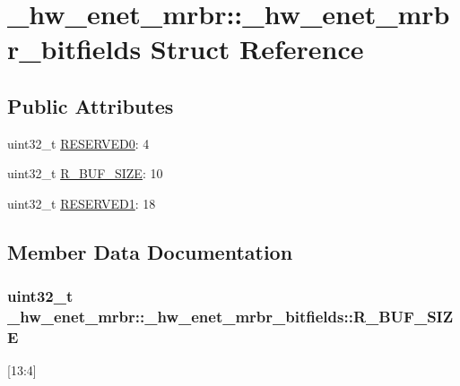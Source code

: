 \hypertarget{struct__hw__enet__mrbr_1_1__hw__enet__mrbr__bitfields}{}\section{\+\_\+hw\+\_\+enet\+\_\+mrbr\+:\+:\+\_\+hw\+\_\+enet\+\_\+mrbr\+\_\+bitfields Struct Reference}
\label{struct__hw__enet__mrbr_1_1__hw__enet__mrbr__bitfields}
\subsection*{Public Attributes}
\begin{DoxyCompactItemize}
\item 
uint32\+\_\+t \hyperlink{struct__hw__enet__mrbr_1_1__hw__enet__mrbr__bitfields_a52ea0ee0b5b36b0ab8bf46fbea3f3438}{R\+E\+S\+E\+R\+V\+E\+D0}\+: 4
\item 
uint32\+\_\+t \hyperlink{struct__hw__enet__mrbr_1_1__hw__enet__mrbr__bitfields_a3ad91c2a9dcc6748e3bfa904d75a0226}{R\+\_\+\+B\+U\+F\+\_\+\+S\+I\+ZE}\+: 10
\item 
uint32\+\_\+t \hyperlink{struct__hw__enet__mrbr_1_1__hw__enet__mrbr__bitfields_a7658a0a6285fcb271f2581fbd81184c0}{R\+E\+S\+E\+R\+V\+E\+D1}\+: 18
\end{DoxyCompactItemize}


\subsection{Member Data Documentation}
\subsubsection[{\texorpdfstring{R\+\_\+\+B\+U\+F\+\_\+\+S\+I\+ZE}{R_BUF_SIZE}}]{\setlength{\rightskip}{0pt plus 5cm}uint32\+\_\+t \+\_\+hw\+\_\+enet\+\_\+mrbr\+::\+\_\+hw\+\_\+enet\+\_\+mrbr\+\_\+bitfields\+::\+R\+\_\+\+B\+U\+F\+\_\+\+S\+I\+ZE}\hypertarget{struct__hw__enet__mrbr_1_1__hw__enet__mrbr__bitfields_a3ad91c2a9dcc6748e3bfa904d75a0226}{}\label{struct__hw__enet__mrbr_1_1__hw__enet__mrbr__bitfields_a3ad91c2a9dcc6748e3bfa904d75a0226}
\mbox{[}13\+:4\mbox{]} 
